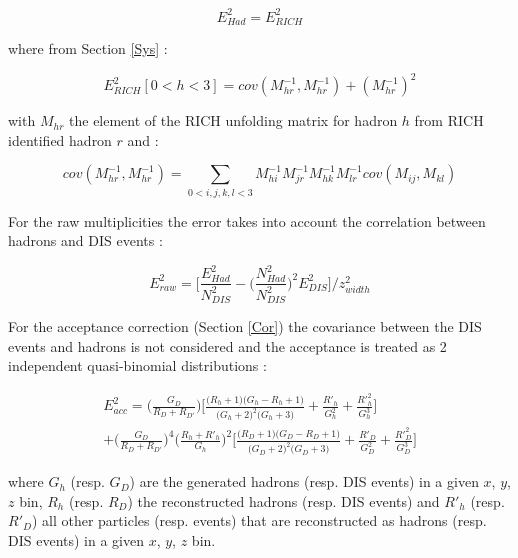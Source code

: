 \documentclass[letterpaper,12pt]{article}
\begin{document}
\begin{equation}
		E^2_{Had} = E^2_{RICH}
\end{equation}

where from Section \ref{Sys} :

\begin{equation}
		E^2_{RICH}[0<h<3] = cov(M^{-1}_{hr},M^{-1}_{hr})+(M^{-1}_{hr})^2
\end{equation}

with $M_{hr}$ the element of the RICH unfolding matrix for hadron $h$ from RICH identified hadron $r$ and :

\begin{equation}
		cov(M^{-1}_{hr},M^{-1}_{hr}) = \sum_{0<i,j,k,l<3} M^{-1}_{hi}M^{-1}_{jr}M^{-1}_{hk}M^{-1}_{lr}cov(M_{ij},M_{kl})
\end{equation}

For the raw multiplicities the error takes into account the correlation between hadrons and DIS events :

\begin{equation}
		E^2_{raw} = \Bigg[\frac{E^2_{Had}}{N^2_{DIS}} - \bigg( \frac{N^2_{Had}}{N^2_{DIS}} \bigg)^2 E^2_{DIS} \Bigg]/z^2_{width}
\end{equation}

For the acceptance correction (Section \ref{Cor}) the covariance between the DIS events and hadrons is not considered and the acceptance is treated as 2 independent quasi-binomial distributions :

\begin{equation}
\begin{split}
		E^2_{acc} = \bigg(\frac{G_D}{R_D+R_{D'}}\bigg) \bigg[ \frac{\big( R_h+1 \big)\big( G_h-R_h+1 \big)}{\big( G_h+2 \big)^2\big( G_h+3 \big)}+\frac{R'_h}{G^2_h}+\frac{R'^2_h}{G^3_h} \bigg] \\
		+ \bigg(\frac{G_D}{R_D+R_{D'}}\bigg)^4 \bigg(\frac{R_h+R'_h}{G_h}\bigg)^2 \bigg[ \frac{\big( R_D+1 \big)\big( G_D-R_D+1 \big)}{\big( G_D+2 \big)^2\big( G_D+3 \big)}+\frac{R'_D}{G^2_D}+\frac{R'^2_D}{G^3_D} \bigg]
\end{split}
\end{equation}

where $G_h$ (resp. $G_D$) are the generated hadrons (resp. DIS events) in a given $x$, $y$, $z$ bin, $R_h$ (resp. $R_D$) the reconstructed hadrons (resp. DIS events) and $R'_h$ (resp. $R'_D$) all other particles (resp. events) that are reconstructed as hadrons (resp. DIS events) in a given $x$, $y$, $z$ bin.
\end{document}
